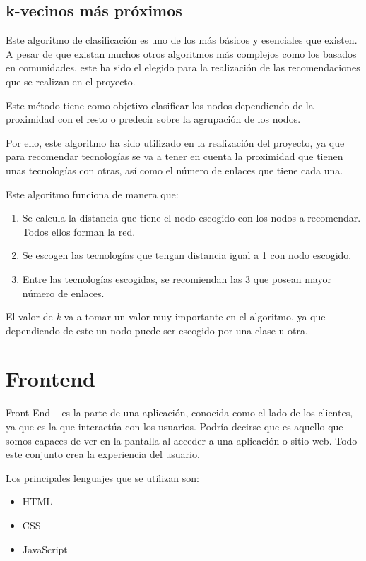 \subsection{k-vecinos más próximos}
Este algoritmo \cite{wiki:knn} de clasificación es uno de los más básicos y esenciales que existen. A pesar de que existan muchos otros algoritmos más complejos como los basados en comunidades, este ha sido el elegido para la realización de las recomendaciones que se realizan en el proyecto.

Este método tiene como objetivo clasificar los nodos dependiendo de la proximidad con el resto o predecir sobre la agrupación de los nodos.

Por ello, este algoritmo ha sido utilizado en la realización del proyecto, ya que para recomendar tecnologías se va a tener en cuenta la proximidad que tienen unas tecnologías con otras, así como el número de enlaces que tiene cada una.

Este algoritmo funciona de manera que:

\begin{enumerate}
    \item Se calcula la distancia que tiene el nodo escogido con los nodos a recomendar. Todos ellos forman la red.
    \item Se escogen las tecnologías que tengan distancia igual a 1 con nodo escogido.
    \item Entre las tecnologías escogidas, se recomiendan las 3 que posean mayor número de enlaces.
\end{enumerate}

El valor de \textit{k} va a tomar un valor muy importante en el algoritmo, ya que dependiendo de este un nodo puede ser escogido por una clase u otra.

\section{Frontend}
Front End ~\cite{wiki:frontend} es la parte de una aplicación, conocida como el lado de los clientes, ya que es la que interactúa con los usuarios. Podría decirse que es aquello que somos capaces de ver en la pantalla al acceder a una aplicación o sitio web. Todo este conjunto crea la experiencia del usuario.

Los principales lenguajes que se utilizan son:
\begin{itemize}
    \item HTML
    \item CSS
    \item JavaScript
\end{itemize}

